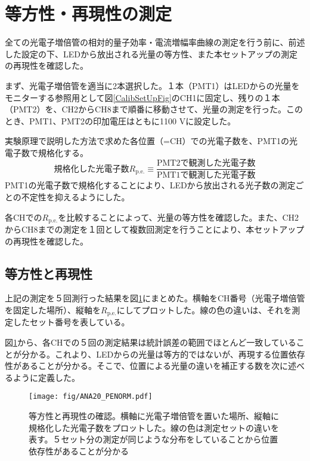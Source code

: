 \documentclass[11pt]{ltjsreport}
\newcommand{\figref}[1]{図\ref{#1}}
\newcommand{\pe}{\mathrm{p.e.}}
\begin{document}
\section{等方性・再現性の測定}
全ての光電子増倍管の相対的量子効率・電流増幅率曲線の測定を行う前に、前述した設定の下、LEDから放出される光量の等方性、また本セットアップの測定の再現性を確認した。

まず、光電子増倍管を適当に2本選択した。１本（PMT1）はLEDからの光量をモニターする参照用として\figref{CalibSetUpFig}のCH1に固定し、残りの１本（PMT2）を、CH2からCH8まで順番に移動させて、光量の測定を行った。このとき、PMT1、PMT2の印加電圧はともに1100 Vに設定した。

実験原理で説明した方法で求めた各位置（=CH）での光電子数を、PMT1の光電子数で規格化する。
\begin{equation}
\text{規格化した光電子数}R_{\pe} \equiv \frac{\text{PMT2で観測した光電子数}}{\text{PMT1で観測した光電子数}}
\end{equation}
PMT1の光電子数で規格化することにより、LEDから放出される光子数の測定ごとの不定性を抑えるようにした。

各CHでの$R_{\pe}$を比較することによって、光量の等方性を確認した。また、CH2からCH8までの測定を１回として複数回測定を行うことにより、本セットアップの再現性を確認した。



\subsection{等方性と再現性}
上記の測定を５回測行った結果を\figref{CalibIsoRepCheck}にまとめた。横軸をCH番号（光電子増倍管を固定した場所）、縦軸を$R_{\pe}$にしてプロットした。線の色の違いは、それを測定したセット番号を表している。

\figref{CalibIsoRepCheck}から、各CHでの５回の測定結果は統計誤差の範囲でほとんど一致していることが分かる。これより、LEDからの光量は等方的ではないが、再現する位置依存性があることが分かる。そこで、位置による光量の違いを補正する数を次に述べるように定義した。

\begin{figure}[htbp]
\begin{center}
\texttt{[image: fig/ANA20\_PENORM.pdf]}
\caption[等方性と再現性の確認]{等方性と再現性の確認。横軸に光電子増倍管を置いた場所、縦軸に規格化した光電子数をプロットした。線の色は測定セットの違いを表す。５セット分の測定が同じような分布をしていることから位置依存性があることが分かる}
\label{CalibIsoRepCheck}
\end{center}
\end{figure}
\end{document}
